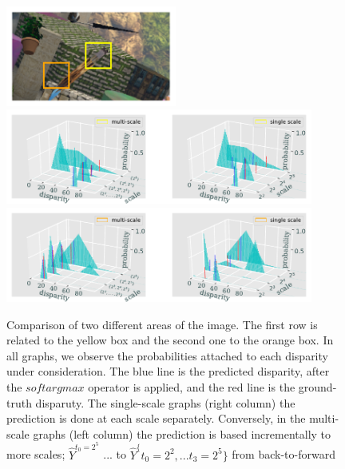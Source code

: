 \documentclass[runningheads]{llncs}
\begin{document}
\begin{figure}[htb!]
    \begin{center}
        \includegraphics[width=0.5\textwidth]{paper/latex/figures/multiscale_importance_image_patches.pdf}\\
        \includegraphics[width=0.9\textwidth]{paper/latex/figures/multiscale_importance_graph_high_resolution.pdf}\\
        \includegraphics[width=0.9\textwidth]{figures/multiscale_importance_graph_low_resolution.pdf}
    \end{center}
    
    \caption{Comparison of two different areas of the image. The first row is related to the yellow box and the second one to the orange box. In all graphs, we observe the probabilities attached to each disparity under consideration. The blue line is the predicted disparity, after the $softargmax$ operator is applied, and the red line is the ground-truth disparuty. The single-scale graphs (right column) the prediction is done at each scale separately. Conversely, in the multi-scale graphs (left column) the prediction is based incrementally to more scales; $\hat{Y}^{t_0 = 2^5}$ ... to $\hat{Y}^\{t_0=2^2, ... t_3 = 2^5\}$ from back-to-forward}
    \label{fig:multiscale_importance}
\end{figure}
\end{document}
